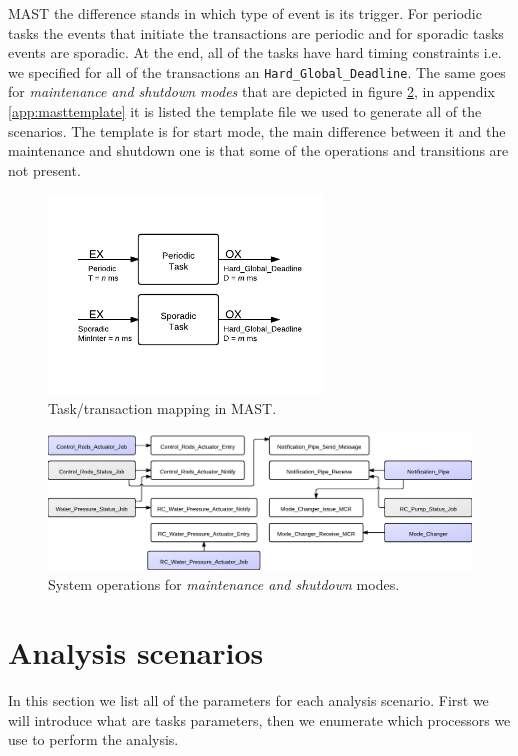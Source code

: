 \documentclass[10pt,a4paper]{report}
\begin{document}
MAST the difference stands in which type of event is its trigger. For periodic 
tasks the events that initiate the transactions are periodic and for sporadic 
tasks events are sporadic. At the end, all of the tasks have hard timing 
constraints i.e. we specified for all of the transactions an 
\texttt{Hard\_Global\_Deadline}. The same goes for \emph{maintenance and 
shutdown modes} that are depicted in figure \ref{fig:mmmode}, in appendix 
\ref{app:masttemplate} it is listed the template file we used to generate all 
of the scenarios. The template is for start mode, the main difference between it 
and the maintenance and shutdown one is that some of the operations and 
transitions are not present. 
\begin{figure}[htb]
\centering 
\includegraphics[width=0.65\textwidth]{diagrams/TransMAST}
\caption{Task/transaction mapping in MAST.}
\label{fig:masttrans}
\end{figure}

\begin{figure}[htb]
\centering 
\includegraphics[width=\textwidth]{diagrams/TraMM}
\caption{System operations for \emph{maintenance and shutdown} modes.}
\label{fig:mmmode}
\end{figure}

\section{Analysis scenarios}
In this section we list all of the parameters for each analysis scenario. First
we will introduce what are tasks parameters, then we enumerate which processors 
we use to perform the analysis.
\end{document}
